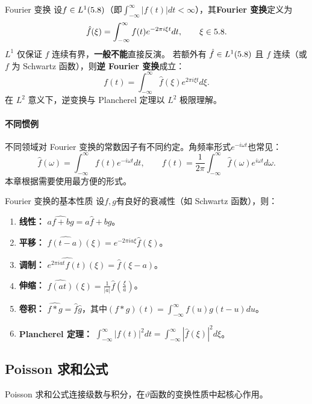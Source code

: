\begin{definition}{Fourier 变换}{}
设$f \in L^1(5.8)$（即$\int_{-\infty}^{\infty}|f(t)|dt < \infty$），其\textbf{Fourier 变换}定义为
\[
\hat{f}(\xi) = \int_{-\infty}^{\infty} f(t) e^{-2\pi i \xi t} dt, \qquad \xi \in 5.8.
\]
$L^1$ 仅保证 $\hat f$ 连续有界，\textbf{一般不能}直接反演。
若额外有 $\hat f\in L^1(5.8)$ 且 $f$ 连续（或 $f$ 为 Schwartz 函数），则\textbf{逆 Fourier 变换}成立：
\[
f(t) = \int_{-\infty}^{\infty} \hat{f}(\xi) e^{2\pi i \xi t} d\xi.
\]
在 $L^2$ 意义下，逆变换与 Plancherel 定理以 $L^2$ 极限理解。
\end{definition}


\paragraph{不同惯例}
不同领域对 Fourier 变换的常数因子有不同约定。角频率形式$e^{-i\omega t}$也常见：
\[
\hat{f}(\omega) = \int_{-\infty}^{\infty} f(t) e^{-i\omega t} dt, \qquad
f(t) = \frac{1}{2\pi}\int_{-\infty}^{\infty} \hat{f}(\omega) e^{i\omega t} d\omega.
\]
本章根据需要使用最方便的形式。


\begin{theorem}{Fourier 变换的基本性质}{}
设$f,g$有良好的衰减性（如 Schwartz 函数），则：
\begin{enumerate}
    \item \textbf{线性：} $\widehat{af+bg} = a\hat{f} + b\hat{g}$。
    \item \textbf{平移：} $\widehat{f(t-a)}(\xi) = e^{-2\pi i a\xi}\hat{f}(\xi)$。
    \item \textbf{调制：} $\widehat{e^{2\pi i a t}f(t)}(\xi) = \hat{f}(\xi - a)$。
    \item \textbf{伸缩：} $\widehat{f(at)}(\xi) = \frac{1}{|a|}\hat{f}\!\left(\frac{\xi}{a}\right)$。
    \item \textbf{卷积：} $\widehat{f*g} = \hat{f}\hat{g}$，其中$(f*g)(t)=\int_{-\infty}^{\infty}f(u)g(t-u)du$。
    \item \textbf{Plancherel 定理：} $\int_{-\infty}^{\infty} |f(t)|^2 dt = \int_{-\infty}^{\infty} |\hat{f}(\xi)|^2 d\xi$。
\end{enumerate}
\end{theorem}

\subsection{Poisson 求和公式}

Poisson 求和公式连接级数与积分，在$\vartheta$函数的变换性质中起核心作用。

